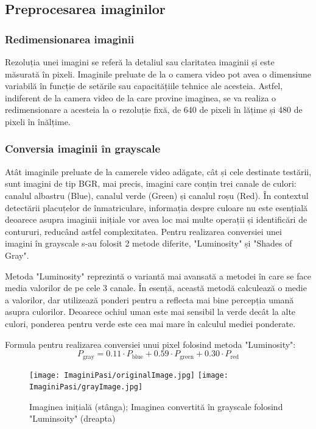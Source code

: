 \documentclass[12pt]{article}
\begin{document}
\subsection{Preprocesarea imaginilor}


\subsubsection{Redimensionarea imaginii}

Rezoluția unei imagini se refer\u{a} la detaliul sau claritatea imaginii și este m\u{a}surat\u{a} \^{i}n pixeli. Imaginile preluate de la o camera video pot avea o dimensiune variabil\u{a} \^{i}n funcție de set\u{a}rile sau capacit\u{a}țiile tehnice ale acesteia. Astfel, indiferent de la camera video de la care provine imaginea, se va realiza o redimensionare a acesteia la o rezoluție fix\u{a}, de 640 de pixeli \^{i}n l\u{a}țime și 480 de pixeli \^{i}n \^{i}n\u{a}lțime.

\subsubsection{Conversia imaginii \^{i}n grayscale}

At\^{a}t imaginile preluate de la camerele video ad\u{a}gate, c\^{a}t și cele destinate test\u{a}rii, sunt imagini de tip BGR, mai precis, imagini care conțin trei canale de culori: canalul albastru (Blue), canalul verde (Green)
și canalul roșu (Red). \^{I}n contextul detect\u{a}rii placuțelor de \^{i}nmatriculare, informația despre culoare nu este esențial\u{a} deoarece asupra imaginii inițiale vor avea loc mai multe operații și identific\u{a}ri de contururi, reduc\^{a}nd astfel complexitatea. Pentru realizarea conversiei unei imagini \^{i}n grayscale s-au folosit 2 metode diferite, "Luminosity" și "Shades of Gray". 

Metoda "Luminosity" reprezint\u{a} o variant\u{a} mai avansat\u{a} a metodei \^{i}n care se face media valorilor de pe cele 3 canale. \^{I}n esenț\u{a}, aceast\u{a} metod\u{a} calculeaz\u{a} o medie a valorilor, dar utilizeaz\u{a} ponderi pentru a reflecta mai bine percepția uman\u{a} asupra culorilor. Deoarece ochiul uman este mai sensibil la verde dec\^{a}t la alte culori, ponderea pentru verde este cea mai mare \^{i}n calculul mediei ponderate.

Formula pentru realizarea conversiei unui pixel folosind metoda "Luminosity":
\begin{equation}
    P_{\mathrm{gray}}=0.11 \cdot P_\mathrm{blue}+0.59 \cdot P_{\mathrm{green}}+0.30 \cdot P_{\mathrm{red}}
\end{equation}
\begin{figure}[H]
  \centering
  \texttt{[image: ImaginiPasi/originalImage.jpg]}\hfill
  \texttt{[image: ImaginiPasi/grayImage.jpg]}
  \caption{Imaginea inițial\u{a} (st\^{a}nga); Imaginea convertit\u{a} \^{i}n grayscale folosind "Luminsoity" (dreapta)}
  \label{fig:conversie_grayscale}
\end{figure}
\end{document}

